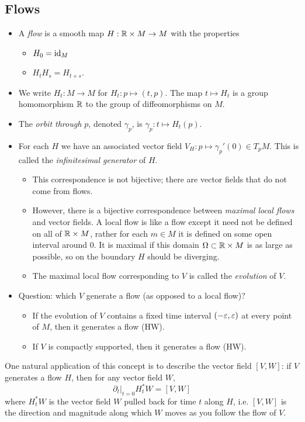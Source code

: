 \documentclass{amsart}
\begin{document}
\subsection{Flows}
\begin{itemize}
\item A \textit{flow} is a smooth map $H:\mathbb{R}\times M\to M$ with the properties \begin{itemize}
	\item $H_0=\operatorname{id}_M$
	\item $H_tH_s=H_{t+s}$.
\end{itemize}
\item We write $H_t:M\to M$ for $H_t:p\mapsto (t,p)$. The map $t\mapsto H_t$ is a group homomorphism $\mathbb{R}$ to the group of diffeomorphisms on $M$. 
\item The \textit{orbit through $p$}, denoted $\gamma_p$, is $\gamma_p:t\mapsto H_t(p)$.
\item For each $H$ we have an associated vector field $V_H:p\mapsto \gamma_p'(0)\in T_pM$. This is called the \textit{infinitesimal generator} of $H$.
\begin{itemize}
	\item This correspondence is not bijective; there are vector fields that do not come from flows.
	\item However, there is a bijective correspondence between \textit{maximal local flows} and vector fields. A local flow is like a flow except it need not be defined on all of $\mathbb{R}\times M$, rather for each $m\in M$ it is defined on some open interval around 0. It is maximal if this domain $\Omega\subset \mathbb{R}\times M$ is as large as possible, so on the boundary $H$ should be diverging.
	\item The maximal local flow corresponding to $V$ is called the \textit{evolution} of $V$.
\end{itemize}
\item Question: which $V$ generate a flow (as opposed to a local flow)?
\begin{itemize}
	\item If the evolution of $V$ contains a fixed time interval $(-\varepsilon,\varepsilon)$ at every point of $M$, then it generates a flow (HW).
	\item If $V$ is compactly supported, then it generates a flow (HW).\\
\end{itemize}
\end{itemize}

One natural application of this concept is to describe the vector field $[V,W]$: if $V$ generates a flow $H$, then for any vector field $W$,
$$
\partial_t|_{t=0} H_t^*W = [V,W]
$$
where $H_t^*W$ is the vector field $W$ pulled back for time $t$ along $H$, i.e. $[V,W]$ is the direction and magnitude along which $W$ moves as you follow the flow of $V$.
\end{document}
